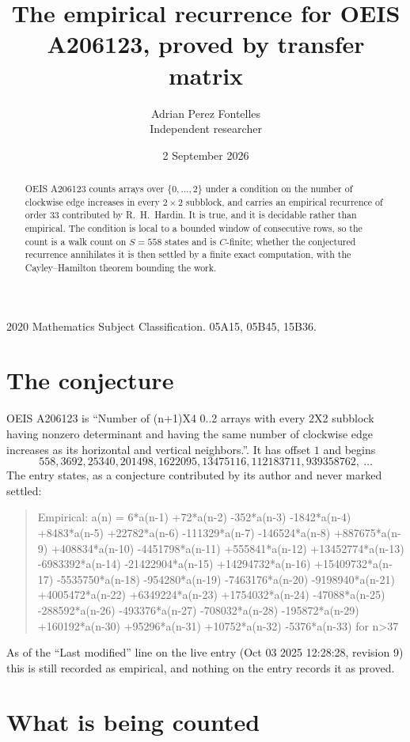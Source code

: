 \documentclass[11pt,a4paper]{article}
\title{The empirical recurrence for OEIS A206123, proved by transfer matrix}
\author{Adrian Perez Fontelles\\ \small Independent researcher}
\date{2 September 2026}
\theoremstyle{plain}
\theoremstyle{definition}
\begin{document}
\maketitle

\begin{abstract}
OEIS A206123 counts arrays over $\{0,\dots,2\}$ under a condition on the number of clockwise edge increases
in every $2\times2$ subblock, and carries an empirical recurrence of order $33$ contributed by
R.~H.~Hardin. It is true, and it is decidable rather than empirical. The condition is local to
a bounded window of consecutive rows, so the count is a walk count on $S=558$ states and is
$C$-finite; whether the conjectured recurrence annihilates it is then settled by a finite exact
computation, with the Cayley--Hamilton theorem bounding the work.
\end{abstract}

\noindent\small 2020 Mathematics Subject Classification. 05A15, 05B45, 15B36.\normalsize

\section{The conjecture}

OEIS A206123 is ``Number of (n+1)X4 0..2 arrays with every 2X2 subblock having nonzero determinant and having the same number of clockwise edge increases as its horizontal and vertical neighbors.''. It has offset $1$ and begins
\[
558, 3692, 25340, 201498, 1622095, 13475116, 112183711, 939358762,\ \dots
\]
The entry states, as a conjecture contributed by its author and never marked settled:
\begin{quote}
Empirical: a(n) = 6*a(n-1) +72*a(n-2) -352*a(n-3) -1842*a(n-4) +8483*a(n-5) +22782*a(n-6) -111329*a(n-7) -146524*a(n-8) +887675*a(n-9) +408834*a(n-10) -4451798*a(n-11) +555841*a(n-12) +13452774*a(n-13) -6983392*a(n-14) -21422904*a(n-15) +14294732*a(n-16) +15409732*a(n-17) -5535750*a(n-18) -954280*a(n-19) -7463176*a(n-20) -9198940*a(n-21) +4005472*a(n-22) +6349224*a(n-23) +1754032*a(n-24) -47088*a(n-25) -288592*a(n-26) -493376*a(n-27) -708032*a(n-28) -195872*a(n-29) +160192*a(n-30) +95296*a(n-31) +10752*a(n-32) -5376*a(n-33) for n>37
\end{quote}
As of the ``Last modified'' line on the live entry (Oct 03 2025 12:28:28, revision 9) this is still
recorded as empirical, and nothing on the entry records it as proved.

\section{What is being counted}
\end{document}
